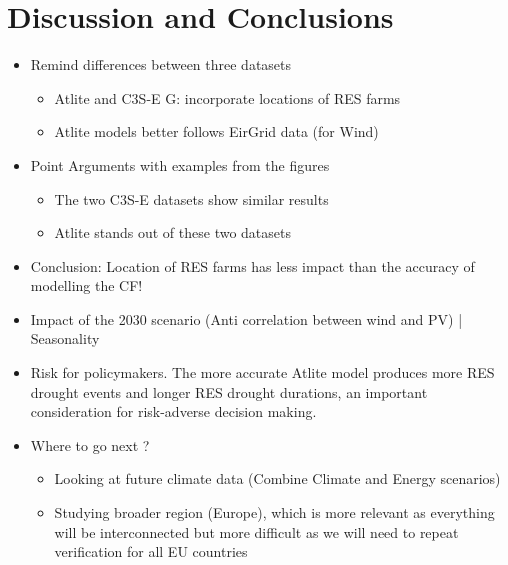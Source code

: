 \documentclass[a4paper, 11pt]{article}
\begin{document}
\newpage
\section{Discussion and Conclusions}
\label{sec:Conclusion}

\begin{itemize}
	\item Remind differences between three datasets
	\begin{itemize}
		\item Atlite and C3S-E G: incorporate locations of RES farms
		\item Atlite models better follows EirGrid data (for Wind)
	\end{itemize}
	\item Point Arguments with examples from the figures
	\begin{itemize}
		\item The two C3S-E datasets show similar results
		\item Atlite stands out of these two datasets
	\end{itemize}
	\item Conclusion: Location of RES farms has less impact than the accuracy of modelling the CF!
	\\
	\item Impact of the 2030 scenario (Anti correlation between wind and PV) | Seasonality
	\\
	\item Risk for policymakers. The more accurate Atlite model produces more RES drought events and longer RES drought durations, an important consideration for risk-adverse decision making.
	\\
	\item Where to go next ?
	\begin{itemize}
		\item Looking at future climate data (Combine Climate and Energy scenarios)
		\item Studying broader region (Europe), which is more relevant as everything will be interconnected but more difficult as we will need to repeat verification for all EU countries
	\end{itemize}
\end{itemize}
\end{document}
